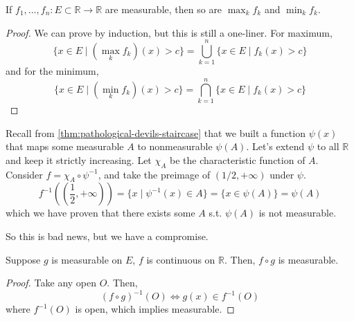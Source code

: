   \begin{theorem}
    \label{thm:finite-min-max-of-measurable-functions-are}
    If $f_1, \ldots, f_n: E \subset \mathbb{R} \to \mathbb{R}$ are measurable, then so are $\max_k f_k$ and $\min_k f_k$. 
  \end{theorem}
  \begin{proof}
    We can prove by induction, but this is still a one-liner. For maximum, 
    \begin{equation}
      \{x \in E \mid (\max_k{f_k})(x) > c \} = \bigcup_{k=1}^n \{x \in E \mid f_k (x) > c\} 
    \end{equation}
    and for the minimum, 
    \begin{equation}
      \{x \in E \mid (\min_k{f_k})(x) > c \} = \bigcap_{k=1}^n \{x \in E \mid f_k (x) > c\} 
    \end{equation}
  \end{proof} 

  \begin{example}
    \label{ex:composition-of-two-functions-need-not-be}
    Recall from \ref{thm:pathological-devils-staircase} that we built a function $\psi(x)$ that maps some measurable $A$ to nonmeasurable $\psi(A)$. Let's extend $\psi$ to all $\mathbb{R}$ and keep it strictly increasing. Let $\chi_A$ be the characteristic function of $A$. Consider $f = \chi_A \circ \psi^{-1}$, and take the preimage of $(1/2, +\infty)$ under $\psi$. 
    \begin{equation}
      f^{-1} ((\frac{1}{2}, +\infty)) = \{x \mid \psi^{-1} (x) \in A \}  = \{x \in \psi(A)\} = \psi(A)
    \end{equation}
    which we have proven  that there exists some $A$ s.t. $\psi(A)$ is not measurable. 
  \end{example}

  So this is bad news, but we have a compromise. 

  \begin{theorem}
    \label{thm:composition-of-measurable-then-continuous-is}
    Suppose $g$ is measurable on $E$, $f$ is continuous on $\mathbb{R}$. Then, $f \circ g$ is measurable. 
  \end{theorem}
  \begin{proof}
    Take any open $O$. Then, 
    \begin{equation}
      (f \circ g)^{-1} (O) \iff g(x) \in f^{-1} (O) 
    \end{equation}
    where $f^{-1} (O)$ is open, which implies measurable. 
  \end{proof}

